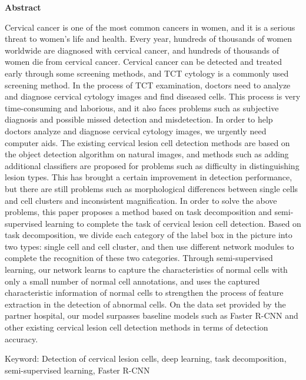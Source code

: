 \cleardoublepage{}
\begin{center}
    \bfseries {} Abstract
\end{center}
\par Cervical cancer is one of the most common cancers in women, and it is a serious threat to women's life and health. Every year, hundreds of thousands of women worldwide are diagnosed with cervical cancer, and hundreds of thousands of women die from cervical cancer. Cervical cancer can be detected and treated early through some screening methods, and TCT cytology is a commonly used screening method. In the process of TCT examination, doctors need to analyze and diagnose cervical cytology images and find diseased cells. This process is very time-consuming and laborious, and it also faces problems such as subjective diagnosis and possible missed detection and misdetection. In order to help doctors analyze and diagnose cervical cytology images, we urgently need computer aids. The existing cervical lesion cell detection methods are based on the object detection algorithm on natural images, and methods such as adding additional classifiers are proposed for problems such as difficulty in distinguishing lesion types. This has brought a certain improvement in detection performance, but there are still problems such as morphological differences between single cells and cell clusters and inconsistent magnification. In order to solve the above problems, this paper proposes a method based on task decomposition and semi-supervised learning to complete the task of cervical lesion cell detection. Based on task decomposition, we divide each category of the label box in the picture into two types: single cell and cell cluster, and then use different network modules to complete the recognition of these two categories. Through semi-supervised learning, our network learns to capture the characteristics of normal cells with only a small number of normal cell annotations, and uses the captured characteristic information of normal cells to strengthen the process of feature extraction in the detection of abnormal cells. On the data set provided by the partner hospital, our model surpasses baseline models such as Faster R-CNN and other existing cervical lesion cell detection methods in terms of detection accuracy.
\par Keyword: Detection of cervical lesion cells, deep learning, task decomposition, semi-supervised learning, Faster R-CNN
